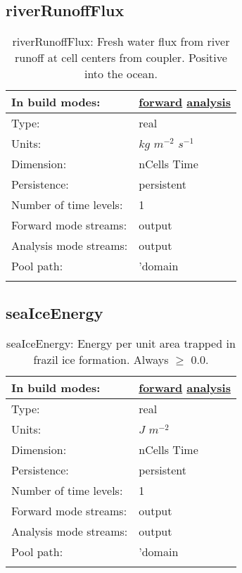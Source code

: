 \subsection[riverRunoffFlux]{riverRunoffFlux}
\label{subsec:var_sec_forcing_riverRunoffFlux}
\begin{center}
\begin{longtable}{| p{2.0in} | p{4.0in} |}
        \hline 
        In build modes: & \hyperref[subsec:forward_var_tab_forcing]{forward} \hyperref[subsec:analysis_var_tab_forcing]{analysis} \\
        \hline 
        Type: & real \\
        \hline 
        Units: & $kg$ $m^{-2}$ $s^{-1}$ \\
        \hline 
        Dimension: & nCells Time \\
        \hline 
        Persistence: & persistent \\
        \hline 
        Number of time levels: & 1 \\
        \hline 
		 Forward mode streams: &  output \\
        \hline 
		 Analysis mode streams: &  output \\
        \hline 
            Pool path: & 'domain %
 \\
		 \hline 
    \caption{riverRunoffFlux: Fresh water flux from river runoff at cell centers from coupler. Positive into the ocean.}
\end{longtable}
\end{center}
\subsection[seaIceEnergy]{seaIceEnergy}
\label{subsec:var_sec_forcing_seaIceEnergy}
\begin{center}
\begin{longtable}{| p{2.0in} | p{4.0in} |}
        \hline 
        In build modes: & \hyperref[subsec:forward_var_tab_forcing]{forward} \hyperref[subsec:analysis_var_tab_forcing]{analysis} \\
        \hline 
        Type: & real \\
        \hline 
        Units: & $J$ $m^{-2}$ \\
        \hline 
        Dimension: & nCells Time \\
        \hline 
        Persistence: & persistent \\
        \hline 
        Number of time levels: & 1 \\
        \hline 
		 Forward mode streams: &  output \\
        \hline 
		 Analysis mode streams: &  output \\
        \hline 
            Pool path: & 'domain %
 \\
		 \hline 
    \caption{seaIceEnergy:  Energy per unit area trapped in frazil ice formation. Always  $\ge$  0.0.}
\end{longtable}
\end{center}
